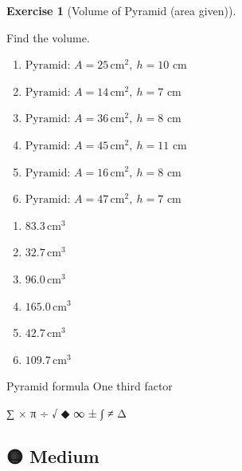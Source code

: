\documentclass[
  letterpaper,
  DIV=11,
  numbers=noendperiod]{scrreprt}
\theoremstyle{definition}
\newtheorem{exercise}{Exercise}[chapter]
\theoremstyle{remark}
\begin{document}
\begin{exercise}[Volume of Pyramid (area
given)]\protect\hypertarget{exr-cur-3}{}\label{exr-cur-3}

Find the volume.

\begin{enumerate}
\def\labelenumi{\alph{enumi})}
\item
  \(\text{Pyramid: }A=25\,\text{cm}^{2},\ h=10\text{ cm}\)
\item
  \(\text{Pyramid: }A=14\,\text{cm}^{2},\ h=7\text{ cm}\)
\item
  \(\text{Pyramid: }A=36\,\text{cm}^{2},\ h=8\text{ cm}\)
\item
  \(\text{Pyramid: }A=45\,\text{cm}^{2},\ h=11\text{ cm}\)
\item
  \(\text{Pyramid: }A=16\,\text{cm}^{2},\ h=8\text{ cm}\)
\item
  \(\text{Pyramid: }A=47\,\text{cm}^{2},\ h=7\text{ cm}\)
\end{enumerate}

\begin{tcolorbox}[enhanced jigsaw, opacitybacktitle=0.6, coltitle=black, arc=.35mm, colframe=quarto-callout-tip-color-frame, colback=white, bottomrule=.15mm, left=2mm, colbacktitle=quarto-callout-tip-color!10!white, titlerule=0mm, opacityback=0, title=\textcolor{quarto-callout-tip-color}{\faLightbulb}\hspace{0.5em}{🔍 View Solution}, leftrule=.75mm, breakable, rightrule=.15mm, bottomtitle=1mm, toptitle=1mm, toprule=.15mm]

\begin{enumerate}
\def\labelenumi{\alph{enumi})}
\item
  \(83.3\,\text{cm}^{3}\)
\item
  \(32.7\,\text{cm}^{3}\)
\item
  \(96.0\,\text{cm}^{3}\)
\item
  \(165.0\,\text{cm}^{3}\)
\item
  \(42.7\,\text{cm}^{3}\)
\item
  \(109.7\,\text{cm}^{3}\)
\end{enumerate}

\end{tcolorbox}

{Pyramid formula} {One third factor}

\end{exercise}

∑ × π ÷ √ ◆ ∞ ± ∫ ≠ Δ

\subsection{🟡 Medium}
\end{document}
